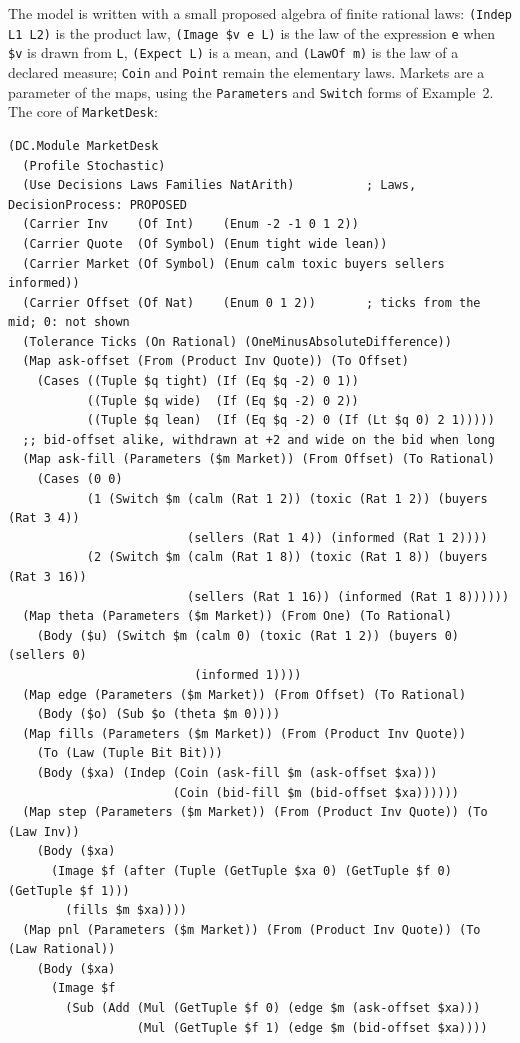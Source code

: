 \documentclass[11pt]{article}
\newcommand{\code}[1]{\texttt{#1}}
\theoremstyle{definition}
\theoremstyle{plain}
\begin{document}
The model is written with a small proposed algebra of finite rational laws: \code{(Indep L1 L2)} is
the product law, \code{(Image \$v e L)} is the law of the expression \code{e} when \code{\$v} is drawn
from \code{L}, \code{(Expect L)} is a mean, and \code{(LawOf m)} is the law of a declared measure;
\code{Coin} and \code{Point} remain the elementary laws. Markets are a parameter of the maps, using the
\code{Parameters} and \code{Switch} forms of Example~2. The core of \code{MarketDesk}:
\begin{lstlisting}
(DC.Module MarketDesk
  (Profile Stochastic)
  (Use Decisions Laws Families NatArith)          ; Laws, DecisionProcess: PROPOSED
  (Carrier Inv    (Of Int)    (Enum -2 -1 0 1 2))
  (Carrier Quote  (Of Symbol) (Enum tight wide lean))
  (Carrier Market (Of Symbol) (Enum calm toxic buyers sellers informed))
  (Carrier Offset (Of Nat)    (Enum 0 1 2))       ; ticks from the mid; 0: not shown
  (Tolerance Ticks (On Rational) (OneMinusAbsoluteDifference))
  (Map ask-offset (From (Product Inv Quote)) (To Offset)
    (Cases ((Tuple $q tight) (If (Eq $q -2) 0 1))
           ((Tuple $q wide)  (If (Eq $q -2) 0 2))
           ((Tuple $q lean)  (If (Eq $q -2) 0 (If (Lt $q 0) 2 1)))))
  ;; bid-offset alike, withdrawn at +2 and wide on the bid when long
  (Map ask-fill (Parameters ($m Market)) (From Offset) (To Rational)
    (Cases (0 0)
           (1 (Switch $m (calm (Rat 1 2)) (toxic (Rat 1 2)) (buyers (Rat 3 4))
                         (sellers (Rat 1 4)) (informed (Rat 1 2))))
           (2 (Switch $m (calm (Rat 1 8)) (toxic (Rat 1 8)) (buyers (Rat 3 16))
                         (sellers (Rat 1 16)) (informed (Rat 1 8))))))
  (Map theta (Parameters ($m Market)) (From One) (To Rational)
    (Body ($u) (Switch $m (calm 0) (toxic (Rat 1 2)) (buyers 0) (sellers 0)
                          (informed 1))))
  (Map edge (Parameters ($m Market)) (From Offset) (To Rational)
    (Body ($o) (Sub $o (theta $m 0))))
  (Map fills (Parameters ($m Market)) (From (Product Inv Quote))
    (To (Law (Tuple Bit Bit)))
    (Body ($xa) (Indep (Coin (ask-fill $m (ask-offset $xa)))
                       (Coin (bid-fill $m (bid-offset $xa))))))
  (Map step (Parameters ($m Market)) (From (Product Inv Quote)) (To (Law Inv))
    (Body ($xa)
      (Image $f (after (Tuple (GetTuple $xa 0) (GetTuple $f 0) (GetTuple $f 1)))
        (fills $m $xa))))
  (Map pnl (Parameters ($m Market)) (From (Product Inv Quote)) (To (Law Rational))
    (Body ($xa)
      (Image $f
        (Sub (Add (Mul (GetTuple $f 0) (edge $m (ask-offset $xa)))
                  (Mul (GetTuple $f 1) (edge $m (bid-offset $xa))))

\end{lstlisting}
\end{document}
